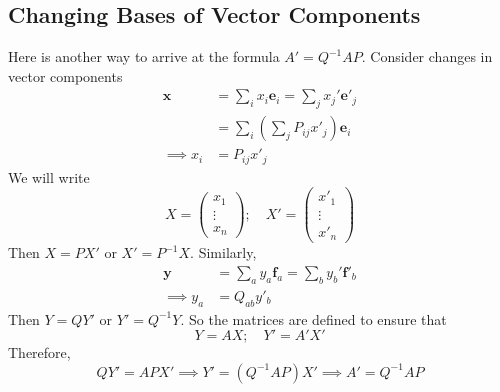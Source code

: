 \documentclass{article}
\begin{document}
	\subsection{Changing Bases of Vector Components}
	Here is another way to arrive at the formula $A' = Q^{-1}AP$. Consider changes in vector components
	\begin{align*}
		\bm x &= \sum_i x_i \bm e_i = \sum_j x_j' \bm e'_j \\
		&= \sum_i\left( \sum_j P_{ij} x'_j \right) \bm e_i \\
		\implies x_i &= P_{ij} x'_j
	\end{align*}
	We will write
	\[ X = \begin{pmatrix}
		x_1 \\ \vdots \\ x_n
	\end{pmatrix};\quad X' = \begin{pmatrix}
		x'_1 \\ \vdots \\ x'_n
	\end{pmatrix} \]
	Then $X = PX'$ or $X' = P^{-1}X$. Similarly,
	\begin{align*}
		\bm y &= \sum_a y_a \bm f_a = \sum_b y_b' \bm f'_b \\
		\implies y_a &= Q_{ab} y'_b
	\end{align*}
	Then $Y = QY'$ or $Y' = Q^{-1}Y$. So the matrices are defined to ensure that
	\[ Y = AX;\quad Y' = A'X' \]
	Therefore,
	\[ QY' = APX' \implies Y' = (Q^{-1}AP)X' \implies A' = Q^{-1}AP \]
\end{document}
